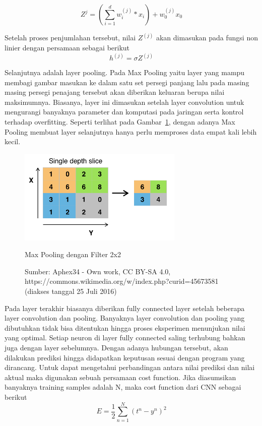 \begin{equation}
Z^{j} = (\sum_{i=1}^{d} w_{i}^{(j)} * x_{i}) + w_{0}^{(j)}x_{0}
\end{equation}

Setelah proses penjumlahan tersebut, nilai $Z^(j)$ akan dimasukan pada fungsi non linier dengan persamaan sebagai berikut
\begin{equation}
h^{(j)} = \sigma Z^{(j)}
\end{equation}

Selanjutnya adalah layer pooling. Pada Max Pooling yaitu layer yang mampu membagi gambar masukan ke dalam satu set persegi panjang lalu pada masing masing persegi penajang tersebut akan diberikan keluaran berupa nilai maksimumnya. Biasanya, layer ini dimasukan setelah layer convolution untuk mengurangi banyaknya parameter dan komputasi pada jaringan serta kontrol terhadap overfitting. Seperti terlihat pada Gambar~\ref{fig:maxpooling}, dengan adanya Max Pooling membuat layer selanjutnya hanya perlu memproses data empat kali lebih kecil.

\begin{figure}[ht]
  \centering
 \includegraphics[width=0.7\textwidth]{maxpooling}
 \caption{Max Pooling dengan Filter 2x2}
  \caption*{Sumber:  Aphex34 - Own work, CC BY-SA 4.0, https://commons.wikimedia.org/w/index.php?curid=45673581 (diakses tanggal 25 Juli 2016)}
 \label{fig:maxpooling}   
\end{figure}

Pada layer terakhir biasanya diberikan fully connected layer setelah beberapa layer convolution dan pooling. Banyaknya layer convolution dan pooling yang dibutuhkan tidak bisa ditentukan hingga proses eksperimen menunjukan nilai yang optimal. Setiap neuron di layer fully connected saling terhubung bahkan juga dengan layer sebelumnya. Dengan adanya hubungan tersebut, akan dilakukan prediksi hingga didapatkan keputusan sesuai dengan program yang dirancang. Untuk dapat mengetahui perbandingan antara nilai prediksi dan nilai aktual maka digunakan sebuah persamaan cost function. Jika diasumsikan banyaknya training samples adalah N, maka cost function dari CNN sebagai berikut
\begin{equation}
 E = \frac{1}{2} \sum_{n=1}^{N} (t^{n} - y^{n})^{2}
\end{equation}

